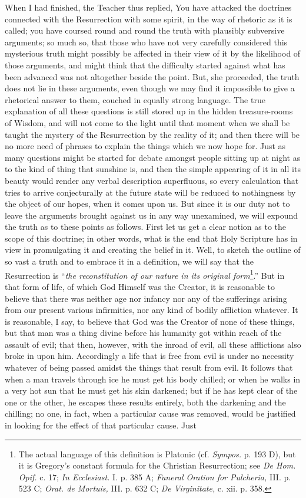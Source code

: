 When I had finished, the Teacher thus replied, You have attacked the doctrines connected with the Resurrection with some spirit, in the way of rhetoric as it is called; you have coursed round and round the truth with plausibly subversive arguments; so much so, that those who have not very carefully considered this mysterious truth might possibly be affected in their view of it by the likelihood of those arguments, and might think that the difficulty started against what has been advanced was not altogether beside the point. But, she proceeded, the truth does not lie in these arguments, even though we may find it impossible to give a rhetorical answer to them, couched in equally strong language. The true explanation of all these questions is still stored up in the hidden treasure-rooms of Wisdom, and will not come to the light until that moment when we shall be taught the mystery of the Resurrection by the reality of it; and then there will be no more need of phrases to explain the things which we now hope for. Just as many questions might be started for debate amongst people sitting up at night as to the kind of thing that sunshine is, and then the simple appearing of it in all its beauty would render any verbal description superfluous, so every calculation that tries to arrive conjecturally at the future state will be reduced to nothingness by the object of our hopes, when it comes upon us. But since it is our duty not to leave the arguments brought against us in any way unexamined, we will expound the truth as to these points as follows. First let us get a clear notion as to the scope of this doctrine; in other words, what is the end that Holy Scripture has in view in promulgating it and creating the belief in it. Well, to sketch the outline of so vast a truth and to embrace it in a definition, we will say that the Resurrection is “\emph{the reconstitution of our nature in its original form}\footnote{The actual language of this definition is Platonic (cf. \emph{Sympos.} p. 193 D), but it is Gregory’s constant formula for the Christian Resurrection; see \emph{De Hom. Opif.} c. 17; \emph{In Ecclesiast.} I. p. 385 A; \emph{Funeral Oration for Pulcheria,} III. p. 523 C; \emph{Orat. de Mortuis,} III. p. 632 C; \emph{De Virginitate,} c. xii. p. 358.}.” But in that form of life, of which God Himself was the Creator, it is reasonable to believe that there was neither age nor infancy nor any of the sufferings arising from our present various infirmities, nor any kind of bodily affliction whatever. It is reasonable, I say, to believe that God was the Creator of none of these things, but that man was a thing divine before his humanity got within reach of the assault of evil; that then, however, with the inroad of evil, all these afflictions also broke in upon him. Accordingly a life that is free from evil is under no necessity whatever of being passed amidst the things that result from evil. It follows that when a man travels through ice he must get his body chilled; or when he walks in a very hot sun that he must get his skin darkened; but if he has kept clear of the one or the other, he escapes these results entirely, both the darkening and the chilling; no one, in fact, when a particular cause was removed, would be justified in looking for the effect of that particular cause. Just 